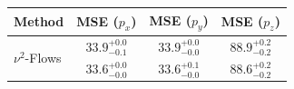     \begin{tabular}{lccc}
        \toprule
        Method & MSE ($p_x$) & MSE ($p_y$) & MSE ($p_z$) \\
        \midrule
         \multirow{2}{*}{$\nu^2$-Flows}& $33.9_{-0.1}^{+0.0}$ & $33.9_{-0.0}^{+0.0}$ & $88.9_{-0.2}^{+0.2}$ \\
         & $33.6_{-0.0}^{+0.0}$ & $33.6_{-0.0}^{+0.1}$ & $88.6_{-0.2}^{+0.2}$ \\
        \bottomrule
    \end{tabular}